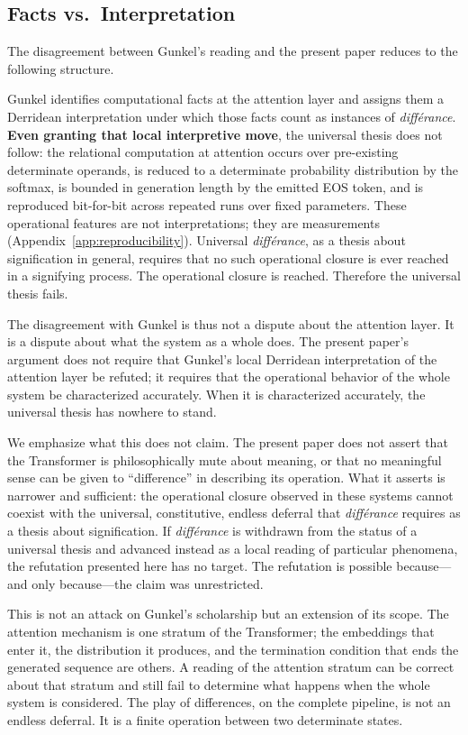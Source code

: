\documentclass[a4paper,twocolumn,11pt]{article}
\begin{document}
\subsection{Facts vs.\ Interpretation}

The disagreement between Gunkel's reading and the present paper reduces to the following structure.

Gunkel identifies computational facts at the attention layer and assigns them a Derridean interpretation under which those facts count as instances of \emph{diff\'erance}. \textbf{Even granting that local interpretive move}, the universal thesis does not follow: the relational computation at attention occurs over pre-existing determinate operands, is reduced to a determinate probability distribution by the softmax, is bounded in generation length by the emitted EOS token, and is reproduced bit-for-bit across repeated runs over fixed parameters. These operational features are not interpretations; they are measurements (Appendix~\ref{app:reproducibility}). Universal \emph{diff\'erance}, as a thesis about signification in general, requires that no such operational closure is ever reached in a signifying process. The operational closure is reached. Therefore the universal thesis fails.

The disagreement with Gunkel is thus not a dispute about the attention layer. It is a dispute about what the system as a whole does. The present paper's argument does not require that Gunkel's local Derridean interpretation of the attention layer be refuted; it requires that the operational behavior of the whole system be characterized accurately. When it is characterized accurately, the universal thesis has nowhere to stand.

We emphasize what this does not claim. The present paper does not assert that the Transformer is philosophically mute about meaning, or that no meaningful sense can be given to ``difference'' in describing its operation. What it asserts is narrower and sufficient: the operational closure observed in these systems cannot coexist with the universal, constitutive, endless deferral that \emph{diff\'erance} requires as a thesis about signification. If \emph{diff\'erance} is withdrawn from the status of a universal thesis and advanced instead as a local reading of particular phenomena, the refutation presented here has no target. The refutation is possible because---and only because---the claim was unrestricted.

This is not an attack on Gunkel's scholarship but an extension of its scope. The attention mechanism is one stratum of the Transformer; the embeddings that enter it, the distribution it produces, and the termination condition that ends the generated sequence are others. A reading of the attention stratum can be correct about that stratum and still fail to determine what happens when the whole system is considered. The play of differences, on the complete pipeline, is not an endless deferral. It is a finite operation between two determinate states.
\end{document}
